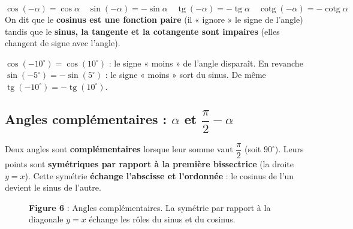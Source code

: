 \documentclass[11pt,a4paper]{article}
\DeclareMathOperator{\tg}{tg}        %
\DeclareMathOperator{\cotg}{cotg}    %
\newcommand{\degr}{^{\circ}}
\begin{document}
\begin{formule}
\[
\boxed{\cos(-\alpha)=\cos\alpha}\quad
\boxed{\sin(-\alpha)=-\sin\alpha}\quad
\boxed{\tg(-\alpha)=-\tg\alpha}\quad
\boxed{\cotg(-\alpha)=-\cotg\alpha}
\]
On dit que le \textbf{cosinus est une fonction paire} (il « ignore » le signe de l'angle) tandis que
le \textbf{sinus, la tangente et la cotangente sont impaires} (elles changent de signe avec l'angle).
\end{formule}

\begin{exemple}
$\cos(-10\degr)=\cos(10\degr)$ : le signe « moins » de l'angle disparaît. En revanche
$\sin(-5\degr)=-\sin(5\degr)$ : le signe « moins » sort du sinus. De même
$\tg(-10\degr)=-\tg(10\degr)$.
\end{exemple}

\subsection{Angles complémentaires : $\alpha$ et $\dfrac{\pi}{2}-\alpha$}
Deux angles sont \textbf{complémentaires} lorsque leur somme vaut $\dfrac{\pi}{2}$ (soit $90\degr$).
Leurs points sont \textbf{symétriques par rapport à la première bissectrice} (la droite $y=x$).
Cette symétrie \textbf{échange l'abscisse et l'ordonnée} : le cosinus de l'un devient le sinus de
l'autre.

\begin{figure}[h]
\centering
{}
\caption*{\small\textbf{\textcolor{primary}{Figure 6}} : Angles complémentaires. La symétrie par
rapport à la diagonale $y=x$ échange les rôles du sinus et du cosinus.}
\end{figure}
\end{document}
